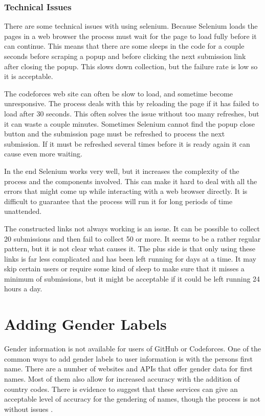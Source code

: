 \documentclass{article}
\begin{document}
\subsubsection*{Technical Issues}
There are some technical issues with using selenium. Because Selenium loads the pages in a web browser the process must wait for the page to load fully before it can continue. This means that there are some sleeps in the code for a couple seconds before scraping a popup and before clicking the next submission link after closing the popup. This slows down collection, but the failure rate is low so it is acceptable.

The codeforces web site can often be slow to load, and sometime become unresponsive. The process deals with this by reloading the page if it has failed to load after 30 seconds. This often solves the issue without too many refreshes, but it can waste a couple minutes. Sometimes Selenium cannot find the popup close button and the submission page must be refreshed to process the next submission. If it must be refreshed several times before it is ready again it can cause even more waiting.

In the end Selenium works very well, but it increases the complexity of the process and the components involved. This can make it hard to deal with all the errors that might come up while interacting with a web browser directly. It is difficult to guarantee that the process will run it for long periods of time unattended.

The constructed links not always working is an issue. It can be possible to collect 20 submissions and then fail to collect 50 or more. It seems to be a rather regular pattern, but it is not clear what causes it. The plus side is that only using these links is far less complicated and has been left running for days at a time. It may skip certain users or require some kind of sleep to make sure that it misses a minimum of submissions, but it might be acceptable if it could be left running 24 hours a day.



\section{Adding Gender Labels}
Gender information is not available for users of GitHub or Codeforces. One of the common ways to add gender labels to user information is with the persons first name. There are a number of websites and APIs that offer gender data for first names. Most of them also allow for increased accuracy with the addition of country codes. There is evidence to suggest that these services can give an acceptable level of accuracy for the gendering of names, though the process is not without issues \cite{Santamaria2018}.
\end{document}

